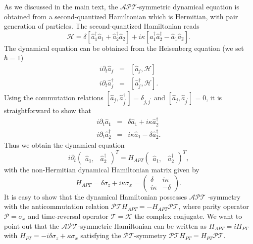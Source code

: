 \documentclass[twocolumn,prl,floatfix,citeautoscript,nofootinbib,superscriptaddress]{revtex4}
\begin{document}
\begin{widetext}
As we discussed in the main text, the $\mathcal{APT}$-symmetric dynamical
equation is obtained from a second-quantized Hamiltonian which is Hermitian,
with pair generation of particles. The second-quantized Hamiltonian reads
\begin{equation}
\mathcal{H}=\delta \left[ \hat{a}_{1}^{\dag }\hat{a}_{1}+\hat{a}_{2}^{\dag }%
\hat{a}_{2}\right] +i\kappa \left[ \hat{a}_{1}^{\dag }\hat{a}_{2}^{\dag }-%
\hat{a}_{1}\hat{a}_{2}\right] .
\end{equation}%
The dynamical equation can be obtained from the Heisenberg equation (we set $%
\hbar=1$)
\begin{eqnarray}
i\partial _{t}\hat{a}_{j} &=&[\hat{a}_{j},\mathcal{H}]  \nonumber \\
i\partial _{t}\hat{a}_{j}^{\dag } &=&[\hat{a}_{j}^{\dag },\mathcal{H}].
\end{eqnarray}%
Using the commutation relations $[\hat{a}_{j},\hat{a}_{j^{\prime }}^{\dag
}]=\delta _{j,j^{\prime }}$ and $[\hat{a}_{j},\hat{a}_{j^{\prime }}]=0$, it
is straightforward to show that
\begin{eqnarray}
i\partial _{t}\hat{a}_{1} &=&\delta \hat{a}_{1}+i\kappa \hat{a}_{2}^{\dag }
\nonumber \\
i\partial _{t}\hat{a}_{2}^{\dag } &=&i\kappa \hat{a}_{1}-\delta \hat{a}%
_{2}^{\dag }.
\end{eqnarray}%
Thus we obtain the dynamical equation
\begin{equation}
i\partial _{t}\left(
\begin{array}{cc}
\hat{a}_{1}, & \hat{a}_{2}^{\dag }%
\end{array}%
\right) ^{T}=H_{APT}\left(
\begin{array}{cc}
\hat{a}_{1}, & \hat{a}_{2}^{\dag }%
\end{array}%
\right) ^{T},
\end{equation}%
with the non-Hermitian dynamical Hamiltonian matrix given by
\begin{equation}
H_{APT}=\delta \sigma _{z}+i\kappa \sigma _{x}=\left(
\begin{array}{cc}
\delta & i\kappa \\
i\kappa & -\delta%
\end{array}%
\right) .  \label{Eq:HAPTS5}
\end{equation}%
It is easy to show that the dynamical Hamiltonian possesses $\mathcal{APT}$%
-symmetry with the anticommutation relation $\mathcal{PT}H_{APT}=-H_{APT}%
\mathcal{PT}$, where parity operator $\mathcal{P}=\sigma _{x}$ and
time-reversal operator $\mathcal{T}=\mathcal{K}$ the complex conjugate. We
want to point out that the $\mathcal{APT}$-symmetric Hamiltonian can be
written as $H_{APT}=iH_{PT}$ with $H_{PT}=-i\delta \sigma _{z}+\kappa \sigma
_{x}$ satisfying the $\mathcal{PT}$-symmetry $\mathcal{PT}H_{PT}=H_{PT}%
\mathcal{PT}$.


\end{widetext}
\end{document}
